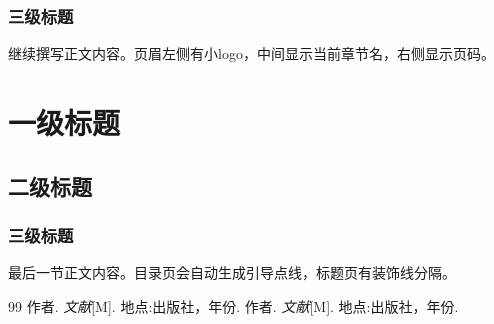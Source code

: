 \documentclass[12pt,a4paper,oneside]{ctexart}
\begin{document}
\subsubsection{三级标题}

继续撰写正文内容。页眉左侧有小logo，中间显示当前章节名，右侧显示页码。

\newpage
\section{一级标题}
\subsection{二级标题}
\subsubsection{三级标题}

最后一节正文内容。目录页会自动生成引导点线，标题页有装饰线分隔。

\newpage
\begin{thebibliography}{99}
    作者. \emph{文献}[M]. 地点:出版社，年份.
    作者. \emph{文献}[M]. 地点:出版社，年份.
\end{thebibliography}
\end{document}
